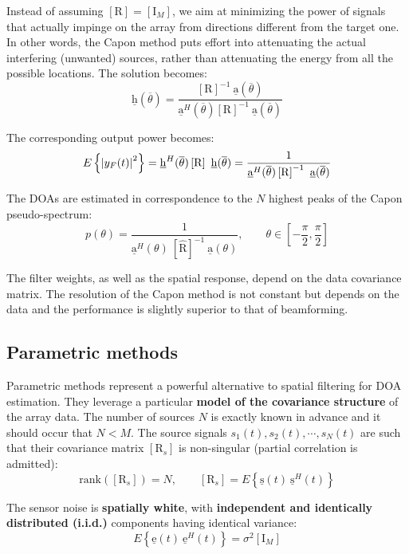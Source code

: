 Instead of assuming $\left[\mathrm{R}\right] = \left[\mathrm{I}_{M}\right]$, we aim at minimizing the power of signals that actually impinge on the array from directions different from the target one.
In other words, the Capon method puts effort into attenuating the actual interfering (unwanted) sources, rather than attenuating the energy from all the possible locations.
The solution becomes:
\[
\underline{\mathrm{h}}(\overline{\theta}) = \frac{\left[\mathrm{R}\right]^{-1} \ \underline{\mathrm{a}}(\overline{\theta})}{\underline{\mathrm{a}}^{H}(\overline{\theta}) \left[\mathrm{R}\right]^{-1} \ \underline{\mathrm{a}}(\overline{\theta})}
\]

The corresponding output power becomes:
\[
E\left\{ \abs{y_{F}(t)}^{2} \right\} = \underline{\mathrm{h}}^{H}(\overline{\theta}) \left[\mathrm{R}\right] \ \underline{\mathrm{h}}(\overline{\theta}) = \frac{1}{\underline{\mathrm{a}}^{H}(\overline{\theta}) \left[\mathrm{R}\right]^{-1} \ \underline{\mathrm{a}}(\overline{\theta})}
\]

The DOAs are estimated in correspondence to the $N$ highest peaks of the Capon pseudo-spectrum:
\[
p(\theta) = \frac{1}{\underline{\mathrm{a}}^{H}(\theta) \ \left[\hat{\mathrm{R}}\right]^{-1} \ \underline{\mathrm{a}}(\theta)},
\qquad \theta \in \left[ -\frac{\pi}{2}, \frac{\pi}{2} \right]
\]

The filter weights, as well as the spatial response, depend on the data covariance matrix.
The resolution of the Capon method is not constant but depends on the data and the performance is slightly superior to that of beamforming.

\subsection{Parametric methods}
Parametric methods represent a powerful alternative to spatial filtering for DOA estimation.
They leverage a particular \textbf{model of the covariance structure} of the array data.
The number of sources $N$ is exactly known in advance and it should occur that $N < M$.
The source signals $s_{1}(t), s_{2}(t), \cdots, s_{N}(t)$ are such that their covariance matrix $\left[\mathrm{R}_{s}\right]$ is non-singular (partial correlation is admitted):
\[
\mathrm{rank}\left( \left[\mathrm{R}_{s}\right] \right) = N, 
\qquad \left[\mathrm{R}_{s}\right] = E \left\{ \underline{\mathrm{s}}(t) \ \underline{\mathrm{s}}^{H}(t) \right\}
\]

The sensor noise is \textbf{spatially white}, with \textbf{independent and identically distributed (i.i.d.)} components having identical variance:
\[
E \left\{ \underline{\mathrm{e}}(t) \ \underline{\mathrm{e}}^{H}(t) \right\} = \sigma^{2} \left[\mathrm{I}_{M}\right]
\]

